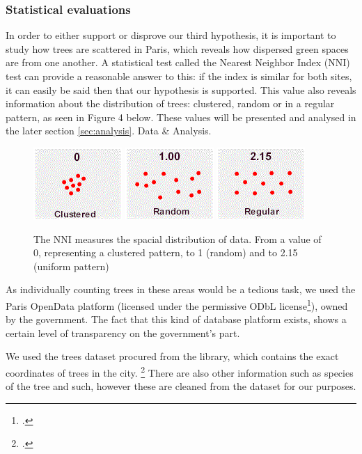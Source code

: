 \documentclass[11pt,letterpaper]{article}
\begin{document}
\subsubsection{Statistical evaluations}

In order to either support or disprove our third hypothesis, it is important to study how trees are scattered in Paris, which reveals how dispersed green spaces are from one another. A statistical test called the Nearest Neighbor Index (NNI) test can provide a reasonable answer to this: if the index is similar for both sites, it can easily be said then that our hypothesis is supported. This value also reveals information about the distribution of trees: clustered, random or in a regular pattern, as seen in Figure 4 below. These values will be presented and analysed in the later section \ref{sec:analysis}. Data \& Analysis.

\begin{figure}[H]
    \centering
    \includegraphics[width=0.2\linewidth]{media/nni1.png}
    \includegraphics[width=0.2\linewidth]{media/nni2.png}
    \includegraphics[width=0.2\linewidth]{media/nni3.png}
    \caption{The NNI measures the spacial distribution of data. From a value of 0, representing a clustered pattern, to 1 (random) and to 2.15 (uniform pattern)}
\end{figure}

As individually counting trees in these areas would be a tedious task, we used the Paris OpenData platform (licensed under the permissive ODbL license\footcite{odbl}), owned by the government. The fact that this kind of database platform exists, shows a certain level of transparency on the government's part.

We used the trees dataset procured from the library, which contains the exact coordinates of trees in the city. \footcite{paris_opendata} There are also other information such as species of the tree and such, however these are cleaned from the dataset for our purposes.
\end{document}
